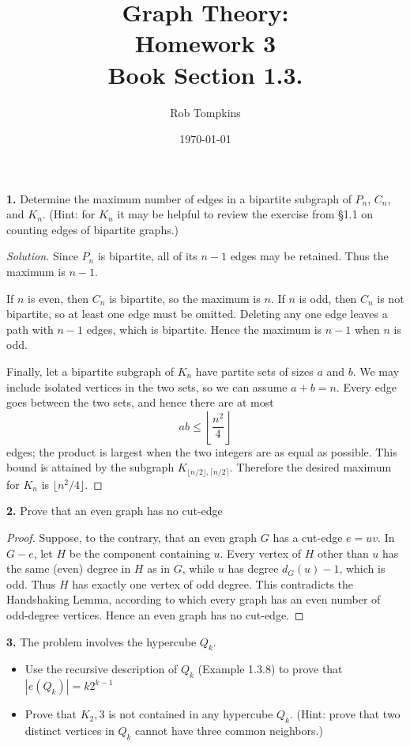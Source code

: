 \documentclass[12pt]{amsart}
\title{Graph Theory:\\Homework 3\\ Book Section 1.3.}
\author{Rob Tompkins}
\date{\today}
\theoremstyle{conjecture}
\theoremstyle{definition}
\theoremstyle{question}
\theoremstyle{theorem}
\newenvironment{solution}
{\begin{proof}[Solution]}
{\end{proof}}
\begin{document}
    \maketitle
    \noindent\textbf{1.} Determine the maximum number of edges in a bipartite subgraph of $P_n$, $C_n$,
    and $K_n$. (Hint: for $K_n$ it may be helpful to review the exercise from \S 1.1 on counting edges
    of bipartite graphs.)

    \begin{solution}
        Since $P_n$ is bipartite, all of its $n-1$ edges may be retained. Thus the maximum is $n-1$.

        If $n$ is even, then $C_n$ is bipartite, so the maximum is $n$. If $n$ is odd, then $C_n$ is not
        bipartite, so at least one edge must be omitted. Deleting any one edge leaves a path with $n-1$
        edges, which is bipartite. Hence the maximum is $n-1$ when $n$ is odd.

        Finally, let a bipartite subgraph of $K_n$ have partite sets of sizes $a$ and $b$. We may include
        isolated vertices in the two sets, so we can assume $a+b=n$. Every edge goes between the two sets,
        and hence there are at most
        \[
            ab\leq \left\lfloor\frac{n^2}{4}\right\rfloor
        \]
        edges; the product is largest when the two integers are as equal as possible. This bound is attained
        by the subgraph $K_{\lfloor n/2\rfloor,\lceil n/2\rceil}$. Therefore the desired maximum for $K_n$ is
        $\lfloor n^2/4\rfloor$.
    \end{solution}

    \noindent\textbf{2.} Prove that an even graph has no cut-edge

    \begin{proof}
        Suppose, to the contrary, that an even graph $G$ has a cut-edge $e=uv$. In $G-e$, let $H$ be the
        component containing $u$. Every vertex of $H$ other than $u$ has the same (even) degree in $H$ as in
        $G$, while $u$ has degree $d_G(u)-1$, which is odd. Thus $H$ has exactly one vertex of odd degree.
        This contradicts the Handshaking Lemma, according to which every graph has an even number of
        odd-degree vertices. Hence an even graph has no cut-edge.
    \end{proof}

    \noindent\textbf{3.} The problem involves the hypercube $Q_k$.
    \begin{itemize}
        \item[(a)] Use the recursive description of $Q_k$ (Example 1.3.8) to prove that
        $|e(Q_k)| = k2^{k-1}$
        \item[(b)] Prove that $K_2,3$ is not contained in any hypercube $Q_k$.
        (Hint: prove that two distinct vertices in $Q_k$ cannot have three common neighbors.)
    \end{itemize}
\end{document}
